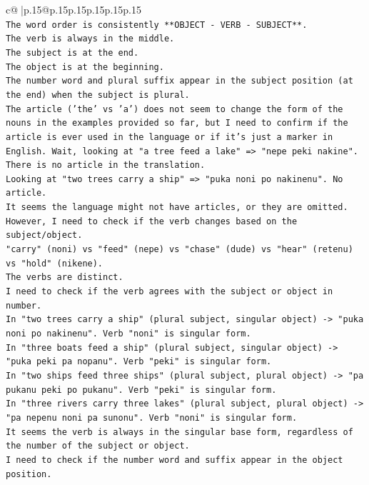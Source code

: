 \documentclass{article}
\begin{document}
{\begin{supertabular}{c@{$\;$}|p{.15\linewidth}@{}p{.15\linewidth}p{.15\linewidth}p{.15\linewidth}p{.15\linewidth}p{.15\linewidth}}
{{{\\ 
\texttt{The word order is consistently **OBJECT {-} VERB {-} SUBJECT**.} \\
\texttt{The verb is always in the middle.} \\
\texttt{The subject is at the end.} \\
\texttt{The object is at the beginning.} \\
\texttt{The number word and plural suffix appear in the subject position (at the end) when the subject is plural.} \\
\texttt{The article ('the' vs 'a') does not seem to change the form of the nouns in the examples provided so far, but I need to confirm if the article is ever used in the language or if it's just a marker in English. Wait, looking at "a tree feed a lake" => "nepe peki nakine". There is no article in the translation.} \\
\texttt{Looking at "two trees carry a ship" => "puka noni po nakinenu". No article.} \\
\texttt{It seems the language might not have articles, or they are omitted.} \\
\texttt{However, I need to check if the verb changes based on the subject/object.} \\
\texttt{"carry" (noni) vs "feed" (nepe) vs "chase" (dude) vs "hear" (retenu) vs "hold" (nikene).} \\
\texttt{The verbs are distinct.} \\
\texttt{I need to check if the verb agrees with the subject or object in number.} \\
\texttt{In "two trees carry a ship" (plural subject, singular object) {-}> "puka noni po nakinenu". Verb "noni" is singular form.} \\
\texttt{In "three boats feed a ship" (plural subject, singular object) {-}> "puka peki pa nopanu". Verb "peki" is singular form.} \\
\texttt{In "two ships feed three ships" (plural subject, plural object) {-}> "pa pukanu peki po pukanu". Verb "peki" is singular form.} \\
\texttt{In "three rivers carry three lakes" (plural subject, plural object) {-}> "pa nepenu noni pa sunonu". Verb "noni" is singular form.} \\
\texttt{It seems the verb is always in the singular base form, regardless of the number of the subject or object.} \\
\texttt{I need to check if the number word and suffix appear in the object position.} \\
}}}
\end{supertabular}}
\end{document}
